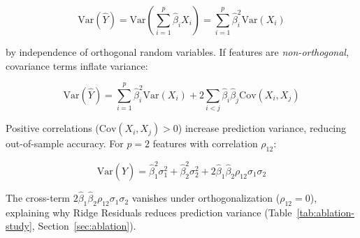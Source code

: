 \begin{equation}
\text{Var}(\hat{Y}) = \text{Var}\left( \sum_{i=1}^{p} \hat{\beta}_i X_i \right) = \sum_{i=1}^{p} \hat{\beta}_i^2 \text{Var}(X_i)
\label{eq:variance-decomp-orthogonal}
\end{equation}

by independence of orthogonal random variables. If features are \emph{non-orthogonal}, covariance terms inflate variance:

\begin{equation}
\text{Var}(\hat{Y}) = \sum_{i=1}^{p} \hat{\beta}_i^2 \text{Var}(X_i) + 2 \sum_{i<j} \hat{\beta}_i \hat{\beta}_j \text{Cov}(X_i, X_j)
\label{eq:variance-decomp-correlated}
\end{equation}

Positive correlations ($\text{Cov}(X_i, X_j) > 0$) increase prediction variance, reducing out-of-sample accuracy. For $p=2$ features with correlation $\rho_{12}$:

\begin{equation}
\text{Var}(\hat{Y}) = \hat{\beta}_1^2 \sigma_1^2 + \hat{\beta}_2^2 \sigma_2^2 + 2 \hat{\beta}_1 \hat{\beta}_2 \rho_{12} \sigma_1 \sigma_2
\end{equation}

The cross-term $2 \hat{\beta}_1 \hat{\beta}_2 \rho_{12} \sigma_1 \sigma_2$ vanishes under orthogonalization ($\rho_{12} = 0$), explaining why Ridge Residuals reduces prediction variance (Table~\ref{tab:ablation-study}, Section~\ref{sec:ablation}).

